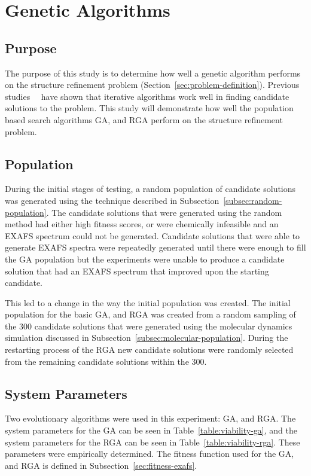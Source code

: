 \section{Genetic Algorithms}
\label{sec:ga-experiment}

\subsection{Purpose}

The purpose of this study is to determine how well a genetic algorithm performs on the structure refinement problem (Section~\ref{sec:problem-definition}). Previous studies~\cite{sproviero2008model}~\cite{luber2011s1} have shown that iterative algorithms work well in finding candidate solutions to the problem. This study will demonstrate how well the population based search algorithms GA, and RGA perform on the structure refinement problem.

\subsection{Population}

During the initial stages of testing, a random population of candidate solutions was generated using the technique described in Subsection~\ref{subsec:random-population}. The candidate solutions that were generated using the random method had either high fitness scores, or were chemically infeasible and an EXAFS spectrum could not be generated. Candidate solutions that were able to generate EXAFS spectra were repeatedly generated until there were enough to fill the GA population but the experiments were unable to produce a candidate solution that had an EXAFS spectrum that improved upon the starting candidate.

This led to a change in the way the initial population was created. The initial population for the basic GA, and RGA was created from a random sampling of the 300 candidate solutions that were generated using the molecular dynamics simulation discussed in Subsection~\ref{subsec:molecular-population}. During the restarting process of the RGA new candidate solutions were randomly selected from the remaining candidate solutions within the 300.

\subsection{System Parameters}

Two evolutionary algorithms were used in this experiment: GA, and RGA. The system parameters for the GA can be seen in Table~\ref{table:viability-ga}, and the system parameters for the RGA can be seen in Table~\ref{table:viability-rga}. These parameters were empirically determined. The fitness function used for the GA, and RGA is defined in Subsection~\ref{sec:fitness-exafs}.

